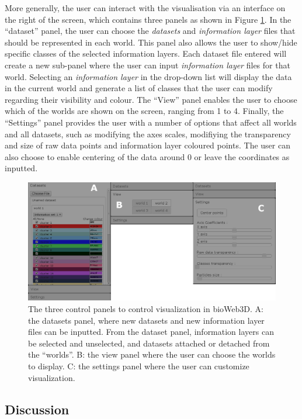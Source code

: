 	More generally, the user can interact with the visualisation via an interface on the right of the screen, which contains three panels as shown in Figure \ref{fig:panels}. In the ``dataset'' panel, the user can choose the {\it{datasets}} and {\it{information layer}} files that should be represented in each world. This panel also allows the user to show/hide specific classes of the selected information layers. Each dataset file entered will create a new sub-panel where the user can input {\it{information layer}} files for that world. Selecting an {\it{information layer}} in the drop-down list will display the data in the current world and generate a list of classes that the user can modify regarding their visibility and colour. The ``View'' panel enables the user to choose which of the worlds are shown on the screen, ranging from 1 to 4. Finally, the ``Settings'' panel provides the user with a number of options that affect all worlds and all datasets, such as modifying the axes scales, modifiying the transparency and size of raw data points and information layer coloured points. The user can also choose to enable centering of the data around 0 or leave the coordinates as inputted.\\
	
	\begin{figure}[h]
\centerline{\includegraphics[width=\linewidth]{gfx/chapter3/panels.png}}
\caption{The three control panels to control visualization in bioWeb3D. A: the datasets panel, where new datasets and new information layer files can be inputted. From the dataset panel, information layers can be selected and unselected, and datasets attached or detached from the ``worlds''. B: the view panel where the user can choose the worlds to display. C: the settings panel where the user can customize visualization.}\label{fig:panels}
	\end{figure}

	\subsection{Discussion}

